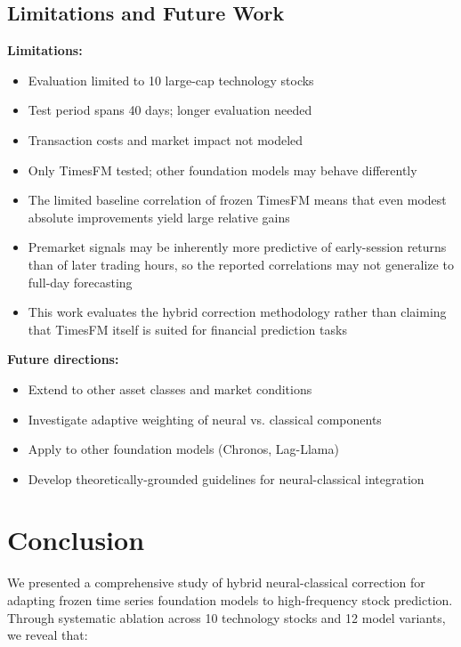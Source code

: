 \documentclass[10pt,conference]{IEEEtran}
\newcommand{\rev}[1]{#1}
\begin{document}
\subsection{Limitations and Future Work}

\textbf{Limitations:}
\begin{itemize}
    \item Evaluation limited to 10 large-cap technology stocks
    \item Test period spans 40 days; longer evaluation needed
    \item Transaction costs and market impact not modeled
    \item Only TimesFM tested; other foundation models may behave differently
    \item \rev{The limited baseline correlation of frozen TimesFM means that even modest absolute improvements yield large relative gains}
    \item \rev{Premarket signals may be inherently more predictive of early-session returns than of later trading hours, so the reported correlations may not generalize to full-day forecasting}
    \item \rev{This work evaluates the hybrid correction methodology rather than claiming that TimesFM itself is suited for financial prediction tasks}
\end{itemize}

\textbf{Future directions:}
\begin{itemize}
    \item Extend to other asset classes and market conditions
    \item Investigate adaptive weighting of neural vs. classical components
    \item Apply to other foundation models (Chronos, Lag-Llama)
    \item Develop theoretically-grounded guidelines for neural-classical integration
\end{itemize}

\section{Conclusion}

We presented a comprehensive study of hybrid neural-classical correction for adapting frozen time series foundation models to high-frequency stock prediction. Through systematic ablation across 10 technology stocks and 12 model variants, we reveal that:
\end{document}
